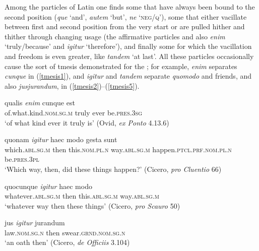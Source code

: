 Among the particles of Latin one finds some that have always been bound to the second position (\emph{que} `and', \emph{autem} `but', \emph{ne} `\textsc{neg/q}'), some that either vacillate between first and second position from the very start or are pulled hither and thither through changing usage (the affirmative particles and also \emph{enim} `truly/because' and \emph{igitur} `therefore'), and finally some for which the vacillation and freedom is even greater, like \emph{tandem} `at last'. All these particles occasionally cause the sort of tmesis demonstrated for the ; for example, \emph{enim} separates \emph{cunque} in (\ref{tmesis1}), and \emph{igitur} and \emph{tandem} separate \emph{quomodo} and friends, and also \emph{jusjurandum}, in (\ref{tmesis2})--(\ref{tmesis5}).

\begin{exe}
\ex
\gll qualis \emph{enim} cunque est\\
of.what.kind.\textsc{nom.sg.m} truly ever be.\textsc{pres.3sg}\\
\trans `of what kind ever it truly is' (Ovid, \textit{ex Ponto} 4.13.6)
\label{tmesis1}
\end{exe}

\begin{exe}
\ex
\gll quonam \emph{igitur} haec modo gesta sunt\\
which.\textsc{abl.sg.m} then this.\textsc{nom.pl.n} way.\textsc{abl.sg.m} happen.\textsc{ptcl.prf.nom.pl.n} be.\textsc{pres.3pl}\\ 
\trans `Which way, then, did these things happen?' (Cicero, \textit{pro Cluentio} 66)
\label{tmesis2}
\end{exe}

\begin{exe}
\ex
\gll quocunque \emph{igitur} haec modo\\
whatever.\textsc{abl.sg.m} then this.\textsc{abl.sg.m} way.\textsc{abl.sg.m}\\ 
\trans `whatever way then these things' (Cicero, \textit{pro Scauro} 50)
\label{tmesis3}
\end{exe}

\begin{exe}
\ex
\gll jus \emph{igitur} jurandum\\
law.\textsc{nom.sg.n} then swear.\textsc{grnd.nom.sg.n}\\ 
\trans `an oath then' (Cicero, \textit{de Officiis} 3.104) 
\label{tmesis4}
\end{exe}

